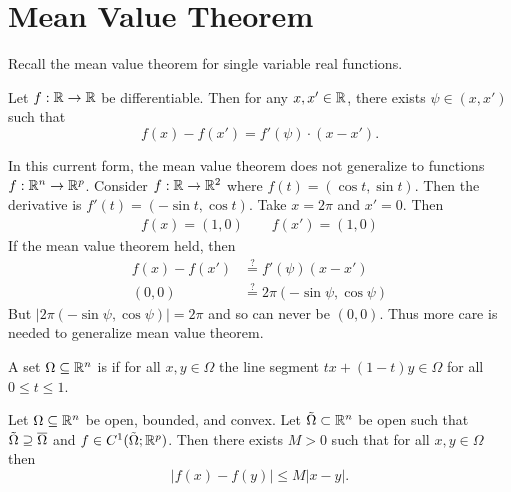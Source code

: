 \documentclass[../main.tex]{subfiles}
\begin{document}
\section{Mean Value Theorem}

Recall the mean value theorem for single variable real functions.
\begin{theorem}
    Let $f: \mathbb{R} \to \mathbb{R}$ be differentiable. Then for any $x, x' \in \mathbb{R}$, there exists $\psi \in (x, x')$ such that
    \[
        f(x) - f(x') = f'(\psi) \cdot (x - x')
    .\]
\end{theorem}
In this current form, the mean value theorem does not generalize to functions $f : \mathbb{R}^n \to \mathbb{R}^p$. Consider $f : \mathbb{R} \to \mathbb{R}^2$ where $f(t) = (\cos t, \sin t)$. Then the derivative is $f'(t) = (- \sin t, \cos t)$. Take $x = 2 \pi$ and $x' = 0$. Then
\begin{align*}
    f(x) = (1,0) \quad\quad f(x') = (1, 0)
\end{align*}
If the mean value theorem held, then
\begin{align*}
    f(x) - f(x') &\stackrel{?}{=} f'(\psi) (x - x') \\
    (0,0) &\stackrel{?}{=} 2 \pi (- \sin \psi, \cos \psi)
\end{align*}
But $|2 \pi (-\sin \psi, \cos \psi)| = 2 \pi$ and so can never be $(0,0)$. Thus more care is needed to generalize mean value theorem.

\begin{definition}
    A set $\Omega \subseteq \mathbb{R}^n$ is  if for all $x,y \in \Omega$ the line segment $tx + (1 - t)y \in \Omega$ for all $0 \leq t \leq 1$.
\end{definition}

\begin{theorem}
    \label{thm:mvt}
    Let $\Omega \subseteq \mathbb{R}^n$ be open, bounded, and convex. Let $\tilde{\Omega} \subset \mathbb{R}^n$ be open such that $\tilde{\Omega} \supseteq \overline{\Omega}$ and $f \in C^1(\tilde{\Omega}; \mathbb{R}^p)$. Then there exists $M > 0$ such that for all $x,y \in \Omega$ then
    \[
        |f(x) - f(y)| \leq M |x-y|
    .\]
\end{theorem}
\end{document}
